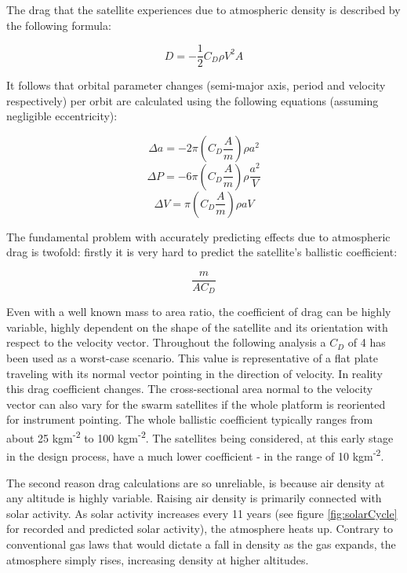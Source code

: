 The drag that the satellite experiences due to atmospheric density is described by the following formula:

\begin{equation}
D = -\frac{1}{2} C_D \rho V^2A
\label{drag}
\end{equation}

It follows that orbital parameter changes (semi-major axis, period and velocity respectively) per orbit are calculated using the following equations (assuming negligible eccentricity):

\begin{equation}
\Delta a = -2 \pi \left( C_D \frac{A}{m} \right) \rho a^2
\label{deltaSMA}
\end{equation}
\begin{equation}
\Delta P = -6 \pi \left( C_D \frac{A}{m} \right) \rho \frac{a^2}{V}
\label{deltaP}
\end{equation}
\begin{equation}
\Delta V = \pi \left( C_D \frac{A}{m} \right) \rho aV
\label{deltaV}
\end{equation}

The fundamental problem with accurately predicting effects due to atmospheric drag is twofold: firstly it is very hard to predict the satellite's ballistic coefficient:

\begin{equation}
\frac{m}{AC_D}
\label{ball}
\end{equation}

Even with a well known mass to area ratio, the coefficient of drag can be highly variable, highly dependent on the shape of the satellite and its orientation with respect to the velocity vector. Throughout the following analysis a $C_D$ of 4 has been used as a worst-case scenario. This value is representative of a flat plate traveling with its normal vector pointing in the direction of velocity. In reality this drag coefficient changes. The cross-sectional area normal to the velocity vector can also vary for the swarm satellites if the whole platform is reoriented for instrument pointing. The whole ballistic coefficient typically ranges from about 25 kgm\textsuperscript{-2} to 100 kgm\textsuperscript{-2}. The satellites being considered, at this early stage in the design process, have a much lower coefficient - in the range of 10 kgm\textsuperscript{-2}.

The second reason drag calculations are so unreliable, is because air density at any altitude is highly variable. Raising air density is primarily connected with solar activity. As solar activity increases every 11 years (see figure \ref{fig:solarCycle} for recorded and predicted solar activity), the atmosphere heats up. Contrary to conventional gas laws that would dictate a fall in density as the gas expands, the atmosphere simply rises, increasing density at higher altitudes.

